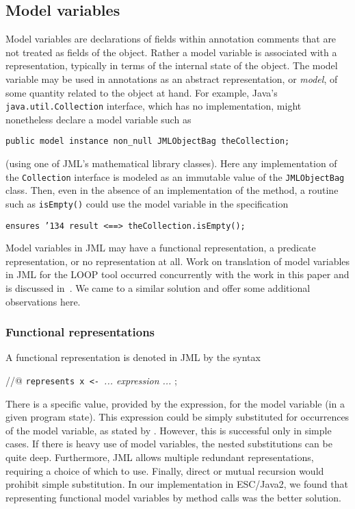 \documentclass{sig-alternate}
\begin{document}
\subsection{Model variables}

Model variables are declarations of fields within annotation comments that are not treated
as fields of the object.  Rather a model variable is associated with a representation, typically in 
terms of the internal state of the object.  The model variable may be used in annotations
as an abstract representation, or {\em model}, of some quantity related to the object at hand.
For example, Java's \texttt{java.util.Collection} interface, which has no implementation, might 
nonetheless declare a model variable such as
\begin{center} \texttt{public model instance non\_null JMLObjectBag theCollection;} \end{center}
(using one of JML's mathematical library classes).  
Here any implementation of the \texttt{Collection} interface is modeled as an immutable value
of the \texttt{JMLObjectBag} class.  
Then, even in the absence of an implementation of the method, a routine such as 
\texttt{isEmpty()} could use the model variable in the specification
\begin{center} \texttt{ensures \char'134 result <==> theCollection.isEmpty();} \end{center}

Model variables in JML may have a functional representation, a
predicate representation, or no representation at all.  Work on
translation of model variables in JML for the LOOP tool occurred
concurrently with the work in this paper and is discussed
in~\cite{BreunessePoll03}.  We came to a similar solution and offer
some additional observations here.

\subsubsection {Functional representations}

A functional representation is denoted in JML by the syntax
\begin{center} //@ \texttt{represents x <- }{\em ... expression ... } ; \end{center}
There is a specific value, provided by the expression, for the model variable (in a given program 
state).   This expression could be simply substituted for occurrences of the model variable, as
stated by \cite{BreunessePoll03}.  However, this is successful only in simple cases.  If there
is heavy use of model variables, the nested substitutions can be quite deep.  Furthermore,
JML allows multiple redundant representations, requiring a choice of which to use.  Finally,
direct or mutual recursion would prohibit simple substitution.  In our implementation in
ESC/Java2, we found that representing functional model variables by method
calls was the better
solution.
\end{document}
